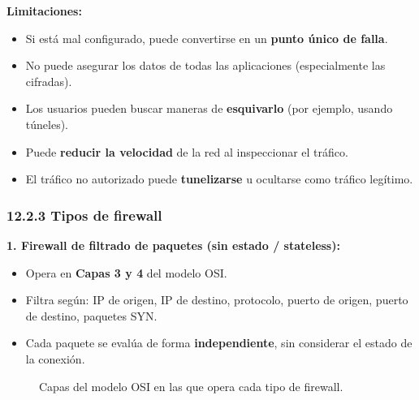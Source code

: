 \documentclass[11pt,a4paper]{article}
\begin{document}
\textbf{Limitaciones:}
\begin{itemize}[leftmargin=2em]
  \item Si está mal configurado, puede convertirse en un \textbf{punto único de falla}.
  \item No puede asegurar los datos de todas las aplicaciones (especialmente las cifradas).
  \item Los usuarios pueden buscar maneras de \textbf{esquivarlo} (por ejemplo, usando túneles).
  \item Puede \textbf{reducir la velocidad} de la red al inspeccionar el tráfico.
  \item El tráfico no autorizado puede \textbf{tunelizarse} u ocultarse como tráfico legítimo.
\end{itemize}

\subsubsection{12.2.3 Tipos de firewall}

\textbf{1. Firewall de filtrado de paquetes (sin estado / stateless):}
\begin{itemize}[leftmargin=2em]
  \item Opera en \textbf{Capas 3 y 4} del modelo OSI.
  \item Filtra según: IP de origen, IP de destino, protocolo, puerto de origen, puerto de destino, paquetes SYN.
  \item Cada paquete se evalúa de forma \textbf{independiente}, sin considerar el estado de la conexión.
\end{itemize}

\begin{figure}[H]
\centering
{}
\caption{Capas del modelo OSI en las que opera cada tipo de firewall.}
\end{figure}
\end{document}
